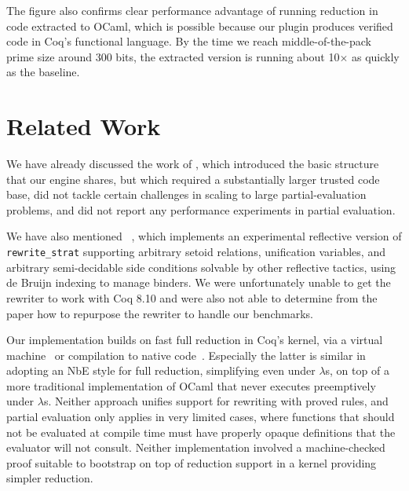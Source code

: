 The figure also confirms clear performance advantage of running reduction in code extracted to OCaml, which is possible because our plugin produces verified code in Coq's functional language.
By the time we reach middle-of-the-pack prime size around 300 bits, the extracted version is running about 10$\times$ as quickly as the baseline.


\section{Related Work}\label{sec:related}

We have already discussed the work of \textcite{Aehlig}, which introduced the basic structure that our engine shares, but which required a substantially larger trusted code base, did not tackle certain challenges in scaling to large partial-evaluation problems, and did not report any performance experiments in partial evaluation.

We have also mentioned \Rtac{}~\cite{rtac}, which implements an experimental reflective version of \texttt{rewrite\_strat} supporting arbitrary setoid relations, unification variables, and arbitrary semi-decidable side conditions solvable by other reflective tactics, using de Bruijn indexing to manage binders.
We were unfortunately unable to get the rewriter to work with Coq 8.10 and were also not able to determine from the paper how to repurpose the rewriter to handle our benchmarks.

Our implementation builds on fast full reduction in Coq's kernel, via a virtual machine~\cite{vmcompute} or compilation to native code~\cite{nativecompute}.
Especially the latter is similar in adopting an NbE style for full reduction, simplifying even under $\lambda$s, on top of a more traditional implementation of OCaml that never executes preemptively under $\lambda$s.
Neither approach unifies support for rewriting with proved rules, and partial evaluation only applies in very limited cases, where functions that should not be evaluated at compile time must have properly opaque definitions that the evaluator will not consult.
Neither implementation involved a machine-checked proof suitable to bootstrap on top of reduction support in a kernel providing simpler reduction.


